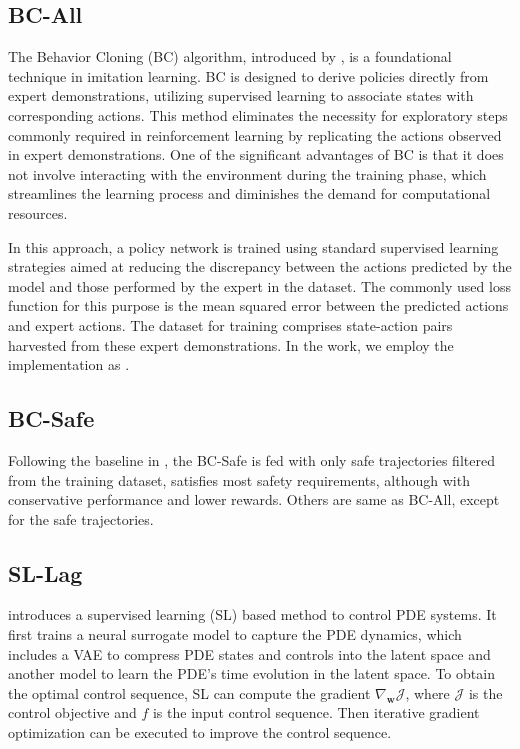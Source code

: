 \subsection{BC-All}
The Behavior Cloning (BC) algorithm, introduced by \citep{pomerleau1988alvinn}, is a foundational technique in imitation learning. BC is designed to derive policies directly from expert demonstrations, utilizing supervised learning to associate states with corresponding actions. This method eliminates the necessity for exploratory steps commonly required in reinforcement learning by replicating the actions observed in expert demonstrations. One of the significant advantages of BC is that it does not involve interacting with the environment during the training phase, which streamlines the learning process and diminishes the demand for computational resources.

In this approach, a policy network is trained using standard supervised learning strategies aimed at reducing the discrepancy between the actions predicted by the model and those performed by the expert in the dataset. The commonly used loss function for this purpose is the mean squared error between the predicted actions and expert actions. The dataset for training comprises state-action pairs harvested from these expert demonstrations. In the work, we employ the implementation as \cite{liu2023datasets}.

\subsection{BC-Safe}
Following the baseline in \cite{liu2023datasets}, the BC-Safe is fed with only safe trajectories filtered from the training dataset, satisfies most safety requirements, although with conservative performance and lower rewards. Others are same as BC-All, except for the safe trajectories.

\subsection{SL-Lag}

\citet{hwang2022solving} introduces a supervised learning (SL) based method to control PDE systems. It first trains a neural surrogate model to capture the PDE dynamics, which includes a VAE to compress PDE states and controls into the latent space and another model to learn the PDE's time evolution in the latent space. To obtain the optimal control sequence, SL can compute the gradient $\nabla_{\mathbf{w}} \mathcal{J}$, where $\mathcal{J}$ is the control objective and $f$ is the input control sequence. Then iterative gradient optimization can be executed to improve the control sequence. 

